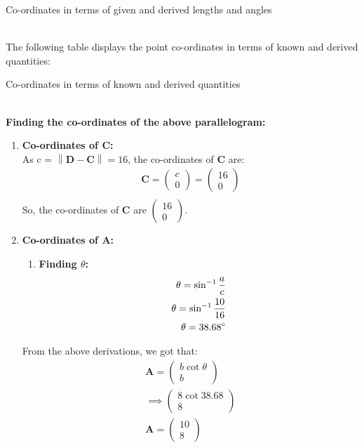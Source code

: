 \documentclass{article}
\providecommand{\norm}[1]{\left\lVert#1\right\rVert}
\newcommand{\myvec}[1]{\ensuremath{\begin{pmatrix}#1\end{pmatrix}}}
\let\vec\mathbf
\begin{document}
\begin{table}[h]
	\centering
	
	\caption{Co-ordinates in terms of given and derived lengths and angles}
	\label{tab:table4}
\end{table}\\
\pagebreak
The following table displays the point co-ordinates in terms of known and derived quantities:\\
\begin{table}[h]
	\centering
	
	\caption{Co-ordinates in terms of known and derived quantities}
	\label{tab:table5}
\end{table}\\
\textbf{Finding the co-ordinates of the above parallelogram:}\\
\begin{enumerate}
	\item \textbf{Co-ordinates of $\vec{C}$:}\\
		As c = $\norm{\vec{D} - \vec{C}} = 16$, the co-ordinates of $\vec{C}$ are:
		\begin{align}
			\vec{C} = \myvec{c\\0} = \myvec{16\\0}\\
		\end{align}
So, the co-ordinates of $\vec{C}$ are $\myvec{16\\0}$.
\item \textbf{Co-ordinates of $\vec{A}$:}\\
	\begin{enumerate}
		\item \textbf{Finding $\theta$:}\\
			\begin{align}
				\theta = \sin^{-1}\frac{a}{c}\\
				\theta = \sin^{-1}\frac{10}{16}\\
				\theta = 38.68\degree\\
			\end{align}
	\end{enumerate}
From the above derivations, we got that:\\
			\begin{align}
				\vec{A} = \myvec{b\cot{\theta}\\b}\\
				\implies \myvec{8\cot{38.68}\\8}\\
				\vec{A} = \myvec{10\\8}\\

\end{align}
\end{enumerate}
\end{document}
